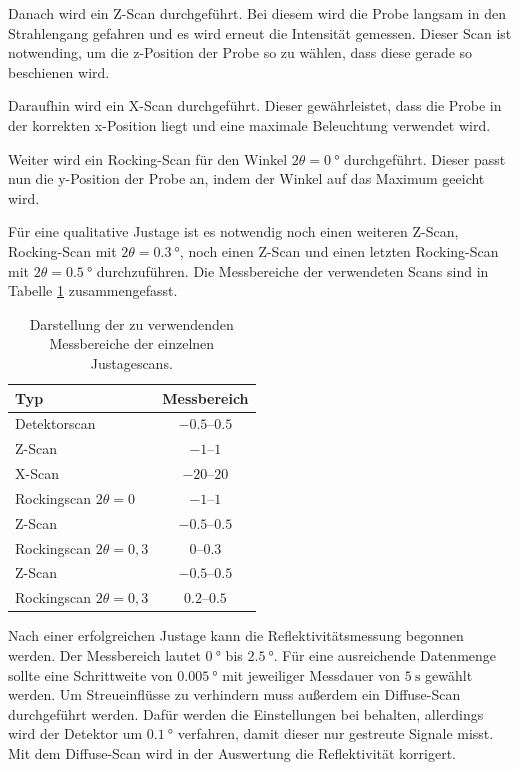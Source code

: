 Danach wird ein Z-Scan durchgeführt. Bei diesem wird die Probe langsam in den Strahlengang gefahren und es wird erneut die Intensität gemessen. Dieser Scan ist notwending, um die 
z-Position der Probe so zu wählen, dass diese gerade so beschienen wird.

Daraufhin wird ein X-Scan durchgeführt. Dieser gewährleistet, dass die Probe in der korrekten x-Position liegt und eine maximale Beleuchtung verwendet wird. 

Weiter wird ein Rocking-Scan für den Winkel $2\theta = \qty{0}{\degree}$ durchgeführt. Dieser passt nun die y-Position der Probe an, indem der Winkel auf das Maximum geeicht wird. 

Für eine qualitative Justage ist es notwendig noch einen weiteren Z-Scan, Rocking-Scan mit $2\theta = \qty{0.3}{\degree}$, noch einen Z-Scan und einen letzten Rocking-Scan mit 
$2\theta = \qty{0.5}{\degree}$ durchzuführen. Die Messbereiche der verwendeten Scans sind in Tabelle \ref{tab:Messbereiche} zusammengefasst.

\begin{table}
    \centering
    \caption{Darstellung der zu verwendenden Messbereiche der einzelnen Justagescans.}
    \label{tab:Messbereiche}
    \begin{tabular}{l c}
      \toprule
      {Typ} & {Messbereich} \\
      \midrule
      {Detektorscan}                & {$\numrange{-0,5}{0,5}$}  \\
      {Z-Scan}                      & {$\numrange{-1}{1}$}      \\
      {X-Scan}                      & {$\numrange{-20}{20}$}    \\
      {Rockingscan $2\theta=0$}     & {$\numrange{-1}{1}$}      \\
      {Z-Scan}                      & {$\numrange{-0,5}{0,5}$}  \\
      {Rockingscan $2\theta=0,3$}   & {$\numrange{0}{0,3}$}     \\
      {Z-Scan}                      & {$\numrange{-0,5}{0,5}$}  \\
      {Rockingscan $2\theta=0,3$}   & {$\numrange{0,2}{0,5}$}   \\
      \bottomrule
    \end{tabular}
\end{table}

Nach einer erfolgreichen Justage kann die Reflektivitätsmessung begonnen werden. Der Messbereich lautet $\qty{0}{\degree}$ bis $\qty{2.5}{\degree}$. Für eine ausreichende 
Datenmenge sollte eine Schrittweite von $\qty{0.005}{\degree}$ mit jeweiliger Messdauer von $\qty{5}{\second}$ gewählt werden. Um Streueinflüsse zu verhindern muss außerdem ein 
Diffuse-Scan durchgeführt werden. Dafür werden die Einstellungen bei behalten, allerdings wird der Detektor um $\qty{0.1}{\degree}$ verfahren, damit dieser nur gestreute Signale 
misst. Mit dem Diffuse-Scan wird in der Auswertung die Reflektivität korrigert.